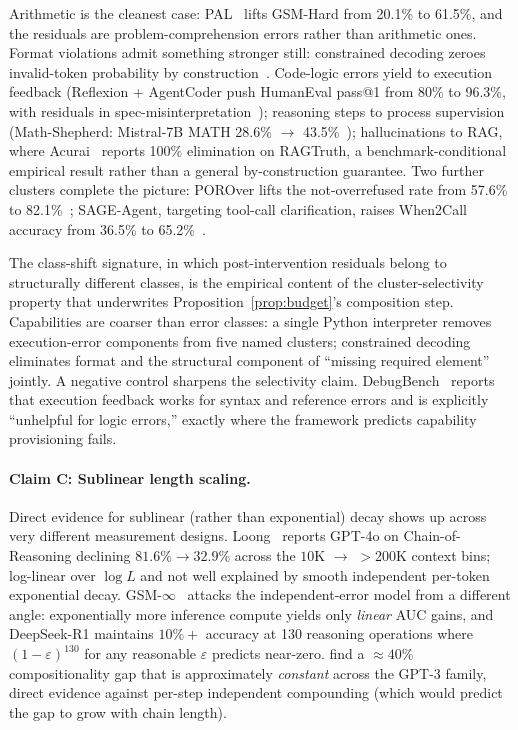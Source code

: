 \documentclass{article}
\theoremstyle{taeplain}
\theoremstyle{taedefn}
\newcommand{\teArrow}{\ensuremath{\rightarrow}}
\newcommand{\teApprox}{\ensuremath{\approx}}
\begin{document}
Arithmetic is the cleanest case: PAL~\citep{gao2022pal} lifts GSM-Hard from 20.1\% to 61.5\%, and the residuals are problem-comprehension errors rather than arithmetic ones. Format violations admit something stronger still: constrained decoding zeroes invalid-token probability by construction~\citep{suresh2025dingo,wang2025slot,dong2024xgrammar}. Code-logic errors yield to execution feedback (Reflexion + AgentCoder push HumanEval pass@1 from 80\% to 96.3\%, with residuals in spec-misinterpretation~\citep{shinn2023reflexion,huang2023agentcoder}); reasoning steps to process supervision (Math-Shepherd: Mistral-7B MATH 28.6\% $\teArrow$ 43.5\%~\citep{wangp2024mathshepherd}); hallucinations to RAG, where Acurai~\citep{wood2024acurai} reports 100\% elimination on RAGTruth, a benchmark-conditional empirical result rather than a general by-construction guarantee. Two further clusters complete the picture: POROver lifts the not-overrefused rate from 57.6\% to 82.1\%~\citep{karaman2024porover}; SAGE-Agent, targeting tool-call clarification, raises When2Call accuracy from 36.5\% to 65.2\%~\citep{suri2025clarification}.

The class-shift signature, in which post-intervention residuals belong to structurally different classes, is the empirical content of the cluster-selectivity property that underwrites Proposition~\ref{prop:budget}'s composition step. Capabilities are coarser than error classes: a single Python interpreter removes execution-error components from five named clusters; constrained decoding eliminates format and the structural component of ``missing required element'' jointly. A negative control sharpens the selectivity claim. DebugBench~\citep{tian2024debugbench} reports that execution feedback works for syntax and reference errors and is explicitly ``unhelpful for logic errors,'' exactly where the framework predicts capability provisioning fails.

\paragraph{Claim C: Sublinear length scaling.}
Direct evidence for sublinear (rather than exponential) decay shows up across very different measurement designs. Loong~\citep{wangm2024loong} reports GPT-4o on Chain-of-Reasoning declining $81.6\% \teArrow 32.9\%$ across the $10$K $\teArrow$ $>$200K context bins; log-linear over $\log L$ and not well explained by smooth independent per-token exponential decay. GSM-$\infty$~\citep{zhou2025gsminfinite} attacks the independent-error model from a different angle: exponentially more inference compute yields only \emph{linear} AUC gains, and DeepSeek-R1 maintains $10\%+$ accuracy at 130 reasoning operations where $(1-\varepsilon)^{130}$ for any reasonable $\varepsilon$ predicts near-zero. \citet{press2023compositionality} find a $\teApprox 40\%$ compositionality gap that is approximately \emph{constant} across the GPT-3 family, direct evidence against per-step independent compounding (which would predict the gap to grow with chain length).
\end{document}
